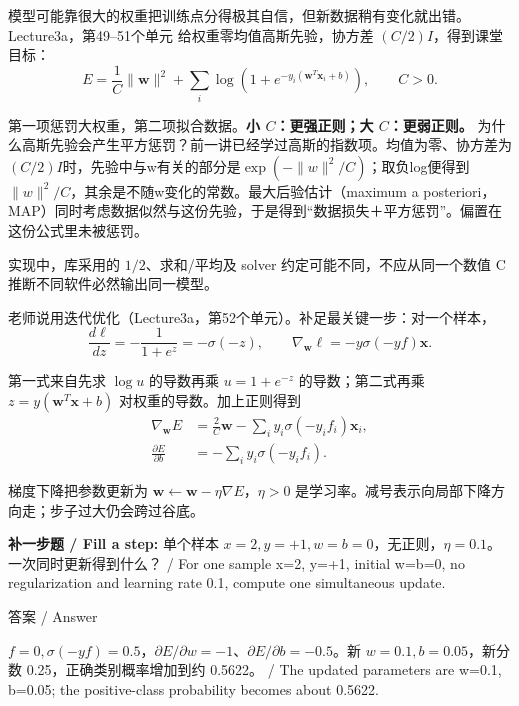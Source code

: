 模型可能靠很大的权重把训练点分得极其自信，但新数据稍有变化就出错。Lecture3a，第49–51个单元 给权重零均值高斯先验，协方差 \((C/2)I\)，得到课堂目标：
\[
E=\frac1C\|\mathbf w\|^2+\sum_i\log(1+e^{-y_i(\mathbf w^T\mathbf x_i+b)}),\qquad C>0.\tag{3.4}
\]


第一项惩罚大权重，第二项拟合数据。\textbf{小 \(C\)：更强正则；大 \(C\)：更弱正则。} 为什么高斯先验会产生平方惩罚？前一讲已经学过高斯的指数项。均值为零、协方差为\((C/2)I\)时，先验中与w有关的部分是\(\exp(-\|w\|^2/C)\)；取负log便得到\(\|w\|^2/C\)，其余是不随w变化的常数。最大后验估计（maximum a posteriori，MAP）同时考虑数据似然与这份先验，于是得到“数据损失＋平方惩罚”。偏置在这份公式里未被惩罚。

实现中，库采用的 \(1/2\)、求和/平均及 solver 约定可能不同，不应从同一个数值 C 推断不同软件必然输出同一模型。


老师说用迭代优化（Lecture3a，第52个单元）。补足最关键一步：对一个样本，
\[
\frac{d\ell}{dz}=-\frac1{1+e^z}=-\sigma(-z),\qquad
\nabla_{\mathbf w}\ell=-y\sigma(-yf)\mathbf x.\tag{3.5}
\]


第一式来自先求 \(\log u\) 的导数再乘 \(u=1+e^{-z}\) 的导数；第二式再乘 \(z=y(\mathbf w^T\mathbf x+b)\) 对权重的导数。加上正则得到
\[
\begin{aligned}\nabla_{\mathbf w}E&=\frac2C\mathbf w-\sum_i y_i\sigma(-y_if_i)\mathbf x_i,\\[3pt]
\frac{\partial E}{\partial b}&=-\sum_i y_i\sigma(-y_if_i).\end{aligned}\tag{3.6}
\]


梯度下降把参数更新为 \(\mathbf w\leftarrow\mathbf w-\eta\nabla E\)，\(\eta>0\) 是学习率。减号表示向局部下降方向走；步子过大仍会跨过谷底。


\textbf{补一步题 / Fill a step:} 单个样本 \(x=2,y=+1,w=b=0\)，无正则，\(\eta=0.1\)。一次同时更新得到什么？ / For one sample x=2, y=+1, initial w=b=0, no regularization and learning rate 0.1, compute one simultaneous update.



\begin{StudySolution}{答案 / Answer}


\(f=0,\sigma(-yf)=0.5\)，\(\partial E/\partial w=-1\)、\(\partial E/\partial b=-0.5\)。新 \(w=0.1,b=0.05\)，新分数 0.25，正确类别概率增加到约 0.5622。 / The updated parameters are w=0.1, b=0.05; the positive-class probability becomes about 0.5622.


\end{StudySolution}



